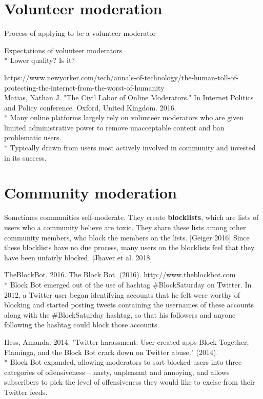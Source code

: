 \documentclass[class=book, crop=false]{standalone}
\providecommand{\keyterm}[1]{\textbf{#1}\marginnote{\scriptsize \textbf{#1}}}
\begin{document}
\section{Volunteer moderation}

Process of applying to be a volunteer moderator

Expectations of volunteer moderators\\
 * Lower quality? Is it?

https://www.newyorker.com/tech/annals-of-technology/the-human-toll-of-protecting-the-internet-from-the-worst-of-humanity\\

Matias, Nathan J. "The Civil Labor of Online Moderators." In Internet Politics and Policy conference. Oxford, United Kingdom. 2016.\\
 * Many online platforms largely rely on volunteer moderators who are given limited administrative power to remove unacceptable content and ban problematic users.\\
 * Typically drawn from users most actively involved in community and invested in its success.

\section{Community moderation}

Sometimes communities self-moderate. They create \keyterm{blocklists}, which are lists of users who a community believe are toxic. They share these lists among other community members, who block the members on the lists. [Geiger 2016] Since these blocklists have no due process, many users on the blocklists feel that they have been unfairly blocked. [Jhaver et al. 2018]

TheBlockBot. 2016. The Block Bot. (2016). http://www.theblockbot.com\\
 * Block Bot emerged out of the use of hashtag \#BlockSaturday on Twitter. In 2012, a Twitter user began identifying accounts that he felt were worthy of blocking and started posting tweets containing the usernames of these accounts along with the \#BlockSaturday hashtag, so that his followers and anyone following the hashtag could block those accounts.

Hess, Amanda. 2014. "Twitter harassment: User-created apps Block Together, Flaminga, and the Block Bot crack down on Twitter abuse." (2014).\\
 * Block Bot expanded, allowing moderators to sort blocked users into three categories of offensiveness -- nasty, unpleasant and annoying, and allows subscribers to pick the level of offensiveness they would like to excise from their Twitter feeds.
\end{document}
